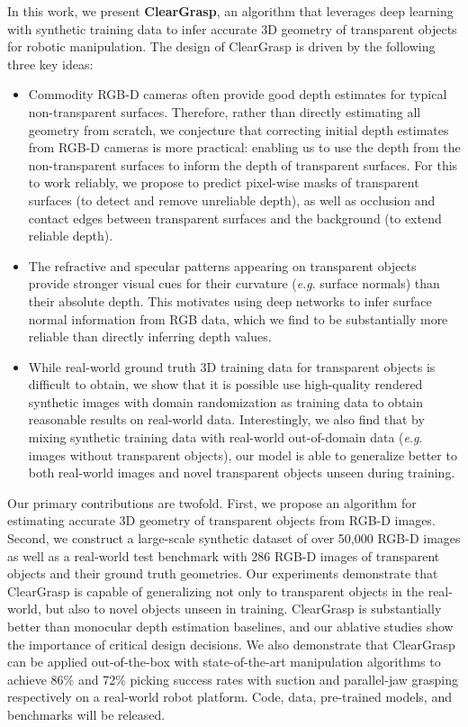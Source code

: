\documentclass[letterpaper, 10 pt, conference]{ieeeconf}
\newcommand{\eg}{\textit{e}.\textit{g}. }
\begin{document}
In this work, we present \textbf{ClearGrasp}, an algorithm that leverages deep learning with synthetic training data to infer accurate 3D geometry of transparent objects for robotic manipulation. The design of ClearGrasp is driven by the following three key ideas:
\begin{itemize}[leftmargin=*]
  \item Commodity RGB-D cameras often provide good depth estimates for typical non-transparent surfaces. Therefore, rather than directly estimating all geometry from scratch, we conjecture that correcting initial depth estimates from RGB-D cameras is more practical: enabling us to use the depth from the non-transparent surfaces to inform the depth of transparent surfaces. For this to work reliably, we propose to predict pixel-wise masks of transparent surfaces (to detect and remove unreliable depth), as well as occlusion and contact edges between transparent surfaces and the background (to extend reliable depth).

  \item The refractive and specular patterns appearing on transparent objects provide stronger visual cues for their curvature (\eg surface normals) than their absolute depth. This motivates using deep networks to infer surface normal information from RGB data, which we find to be substantially more reliable than directly inferring depth values.  
  
  \item While real-world ground truth 3D training data for transparent objects is difficult to obtain, we show that it is possible use high-quality rendered synthetic images with domain randomization as training data to obtain reasonable results on real-world data. Interestingly, we also find that by mixing synthetic training data with real-world out-of-domain data (\eg images without transparent objects), our model is able to generalize better to both real-world images and novel transparent objects unseen during training.
\end{itemize}

Our primary contributions are twofold. First, we propose an algorithm for estimating accurate 3D geometry of transparent objects from RGB-D images. 
Second, we construct a large-scale synthetic dataset of over 50,000 RGB-D images as well as a real-world test benchmark with 286 RGB-D images of transparent objects and their ground truth geometries. Our experiments demonstrate that ClearGrasp is capable of generalizing not only to transparent objects in the real-world, but also to novel objects unseen in training. ClearGrasp is substantially better than monocular depth estimation baselines, and our ablative studies show the importance of critical design decisions. We also demonstrate that ClearGrasp can be applied out-of-the-box with state-of-the-art manipulation algorithms to achieve 86\% and 72\% picking success rates with suction and parallel-jaw grasping respectively on a real-world robot platform. Code, data, pre-trained models, and benchmarks will be released.
\end{document}
